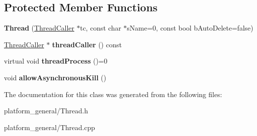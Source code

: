 \subsection*{\-Protected \-Member \-Functions}
\begin{DoxyCompactItemize}
\item 
\hypertarget{classgeneral__server_1_1Thread_a7fb241a8f4a670d8e13d6273fa03b7ab}{{\bfseries \-Thread} (\hyperlink{classgeneral__server_1_1ThreadCaller}{\-Thread\-Caller} $\ast$tc, const char $\ast$s\-Name=0, const bool b\-Auto\-Delete=false)}\label{classgeneral__server_1_1Thread_a7fb241a8f4a670d8e13d6273fa03b7ab}

\item 
\hypertarget{classgeneral__server_1_1Thread_afdd5c8450a620a5fe97ad0c727a0b298}{\hyperlink{classgeneral__server_1_1ThreadCaller}{\-Thread\-Caller} $\ast$ {\bfseries thread\-Caller} () const }\label{classgeneral__server_1_1Thread_afdd5c8450a620a5fe97ad0c727a0b298}

\item 
\hypertarget{classgeneral__server_1_1Thread_a50110859b0a21ee0aaa68cb8f68b725b}{virtual void {\bfseries thread\-Process} ()=0}\label{classgeneral__server_1_1Thread_a50110859b0a21ee0aaa68cb8f68b725b}

\item 
\hypertarget{classgeneral__server_1_1Thread_a80af1e6e136406175c84a242bd9c46f6}{void {\bfseries allow\-Asynchronous\-Kill} ()}\label{classgeneral__server_1_1Thread_a80af1e6e136406175c84a242bd9c46f6}

\end{DoxyCompactItemize}


\-The documentation for this class was generated from the following files\-:\begin{DoxyCompactItemize}
\item 
platform\-\_\-general/\-Thread.\-h\item 
platform\-\_\-general/\-Thread.\-cpp\end{DoxyCompactItemize}
